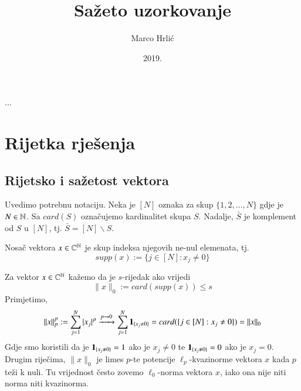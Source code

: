 \documentclass[a4paper,twoside,12pt]{memoir} %
\title{Sa\v{z}eto uzorkovanje}
\author{Marco Hrli\'c}
\date{2019.}  %
\begin{document}
\frontmatter


\begin{intro}
...
\end{intro}

\chapter[Rijetka rje\v{s}enja][Rjetka rje\v{s}enja]{Rijetka rje\v{s}enja}	

\section[Rijetsko i sa\v{z}etost vektora][Rijetsko i sa\v{z}etost vektora]{Rijetsko i sa\v{z}etost vektora}
Uvedimo potrebnu notaciju. Neka je $[N]$ oznaka za skup $\{1,2,...,N\}$ gdje je $N\in\mathbb{N}$. Sa $card(S)$ ozna\v{c}ujemo kardinalitet skupa $S$. Nadalje, $\bar{S}$ je komplement od $S$ u $[N]$, tj. $\bar{S}=[N]\backslash S$.

\begin{defn}
    Nosa\v{c} vektora $x \in \mathbb{C}^{\mathbb{N}}$ je skup indeksa njegovih ne-nul elemenata, tj.
    $$supp(x):=\{j\in[N]:x_j \neq 0 \}$$
\end{defn}

\noindent Za vektor $x\in\mathbb{C}^{\mathbb{N}}$ ka\v{z}emo da je $s$-rijedak ako vrijedi $$\|x\|_0 := card(supp(x)) \leq s$$
Primjetimo,
$$\|x\|_p^p := \sum_{j=1}^N|x_j|^p \xrightarrow{p\rightarrow 0} \sum_{j=1}^N\bold{1}_{\{x_j \neq 0\}} = card(\{j \in [N]:x_j \neq 0\}) = \|x\|_0$$
Gdje smo koristili da je $\bold{1}_{\{x_j \neq 0\}} = 1$  ako je $x_j \neq 0$ te $\bold{1}_{\{x_j \neq 0\}} = 0$  ako je $x_j = 0$. Drugim rije\v{c}ima, $\|x\|_0$ je limes $p$-te potencije $\ell_p$-kvazinorme vektora $x$ kada $p$ te\v{z}i k nuli. Tu vrijednost \v{c}esto zovemo $\ell_0$-norma vektora $x$, iako  ona nije niti norma niti kvazinorma.
\end{document}
